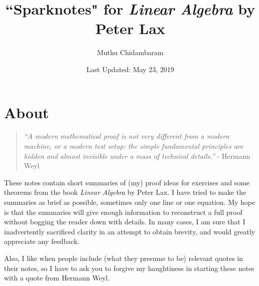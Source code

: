 \documentclass{article}
\begin{document}
\title{``Sparknotes" for \textit{Linear Algebra} by Peter Lax}
\author{Muthu Chidambaram}
\date{Last Updated: May 23, 2019}

\maketitle

\tableofcontents
\newpage 

\section*{About}

\begin{quote}
        \textit{``A modern mathematical proof is not very different from a modern machine,
or a modern test setup: the simple fundamental principles are hidden 
and almost invisible under a mass of technical details.''} - Hermann Weyl
\end{quote}

These notes contain short summaries of (my) proof ideas for exercises
and some theorems from the book \textit{Linear Algebra} by Peter Lax.
I have tried to make the summaries as brief as possible, sometimes only one line or one equation.
My hope is that the summaries will give enough information to reconstruct a full proof without bogging the reader down with details. 
In many cases, I am sure that I inadvertently sacrificed clarity in an attempt to obtain brevity, and would greatly appreciate any feedback.

Also, I like when people include (what they presume to be) relevant quotes in their notes, so I have to ask you to forgive my haughtiness in starting these notes with a quote from Hermann Weyl.





\end{document}
